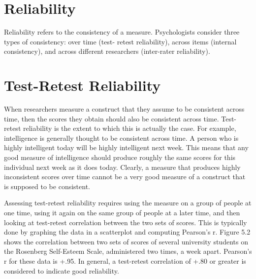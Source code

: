 \documentclass[]{book}
\theoremstyle{definition}
\theoremstyle{definition}
\theoremstyle{remark}
\begin{document}
\section{Reliability}\label{reliability}

Reliability refers to the consistency of a measure. Psychologists
consider three types of consistency: over time (test- retest
reliability), across items (internal consistency), and across different
researchers (inter-rater reliability).

\section{Test-Retest Reliability}\label{test-retest-reliability}

When researchers measure a construct that they assume to be consistent
across time, then the scores they obtain should also be consistent
across time. Test-retest reliability is the extent to which this is
actually the case. For example, intelligence is generally thought to be
consistent across time. A person who is highly intelligent today will be
highly intelligent next week. This means that any good measure of
intelligence should produce roughly the same scores for this individual
next week as it does today. Clearly, a measure that produces highly
inconsistent scores over time cannot be a very good measure of a
construct that is supposed to be consistent.

Assessing test-retest reliability requires using the measure on a group
of people at one time, using it again on the same group of people at a
later time, and then looking at test-retest correlation between the two
sets of scores. This is typically done by graphing the data in a
scatterplot and computing Pearson's r. Figure 5.2 shows the correlation
between two sets of scores of several university students on the
Rosenberg Self-Esteem Scale, administered two times, a week apart.
Pearson's r for these data is +.95. In general, a test-retest
correlation of +.80 or greater is considered to indicate good
reliability.
\end{document}
